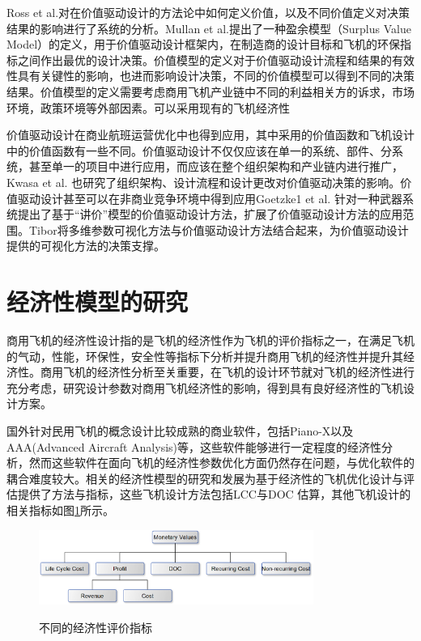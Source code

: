 \documentclass[12pt,a4paper]{report}
\begin{document}
Ross et al.对在价值驱动设计的方法论中如何定义价值，以及不同价值定义对决策结果的影响进行了系统的分析。Mullan et al.提出了一种盈余模型（Surplus Value Model）的定义，用于价值驱动设计框架内，在制造商的设计目标和飞机的环保指标之间作出最优的设计决策。价值模型的定义对于价值驱动设计流程和结果的有效性具有关键性的影响，也进而影响设计决策，不同的价值模型可以得到不同的决策结果。价值模型的定义需要考虑商用飞机产业链中不同的利益相关方的诉求，市场环境，政策环境等外部因素。可以采用现有的飞机经济性

价值驱动设计在商业航班运营优化中也得到应用\cite{677curran2010value}，其中采用的价值函数和飞机设计中的价值函数有一些不同。价值驱动设计不仅仅应该在单一的系统、部件、分系统，甚至单一的项目中进行应用，而应该在整个组织架构\cite{1128monceaux20127}和产业链内进行推广，Kwasa et al.	\cite{1310kwasa2015value}也研究了组织架构、设计流程和设计更改对价值驱动决策的影响。价值驱动设计甚至可以在非商业竞争环境中得到应用Goetzke1 et al.	针对一种武器系统提出了基于“讲价”模型的价值驱动设计方法\cite{1309mullan2011analytical}，扩展了价值驱动设计方法的应用范围。Tibor将多维参数可视化方法与价值驱动设计方法结合起来，为价值驱动设计提供的可视化方法的决策支撑\cite{1302tibor2014visualization}。

\section{经济性模型的研究}

商用飞机的经济性设计指的是飞机的经济性作为飞机的评价指标之一，在满足飞机的气动，性能，环保性，安全性等指标下分析并提升商用飞机的经济性并提升其经济性。商用飞机的经济性分析至关重要，在飞机的设计环节就对飞机的经济性进行充分考虑，研究设计参数对商用飞机经济性的影响，得到具有良好经济性的飞机设计方案。

国外针对民用飞机的概念设计比较成熟的商业软件，包括Piano-X以及AAA(Advanced Aircraft Analysis)等，这些软件能够进行一定程度的经济性分析，然而这些软件在面向飞机的经济性参数优化方面仍然存在问题，与优化软件的耦合难度较大。相关的经济性模型的研究和发展为基于经济性的飞机优化设计与评估提供了方法与指标，这些飞机设计方法包括LCC与DOC 估算，其他飞机设计的相关指标如图\ref{fig_economics}所示。

\begin{figure}[H]
  \centering
  \includegraphics[width=0.8\textwidth]{./eps/economics.png}\\
  \caption{不同的经济性评价指标}
  \label{fig_economics}
\end{figure}
\end{document}
